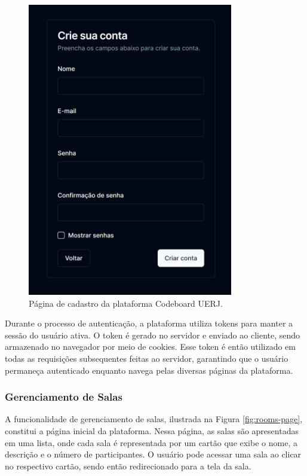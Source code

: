 \begin{figure}[H]
    \centering
    \includegraphics[width=0.8\textwidth]{assets/codeboard/signup-page.png}
    \caption{Página de cadastro da plataforma Codeboard UERJ.}
    \label{fig:signup-page}
\end{figure}

Durante o processo de autenticação, a plataforma utiliza tokens para manter a sessão do usuário ativa. O token é gerado no servidor e enviado ao cliente, sendo armazenado no navegador por meio de cookies. Esse token é então utilizado em todas as requisições subsequentes feitas ao servidor, garantindo que o usuário permaneça autenticado enquanto navega pelas diversas páginas da plataforma.

\subsubsection{Gerenciamento de Salas}

A funcionalidade de gerenciamento de salas, ilustrada na Figura \ref{fig:rooms-page}, constitui a página inicial da plataforma. Nessa página, as salas são apresentadas em uma lista, onde cada sala é representada por um cartão que exibe o nome, a descrição e o número de participantes. O usuário pode acessar uma sala ao clicar no respectivo cartão, sendo então redirecionado para a tela da sala.

